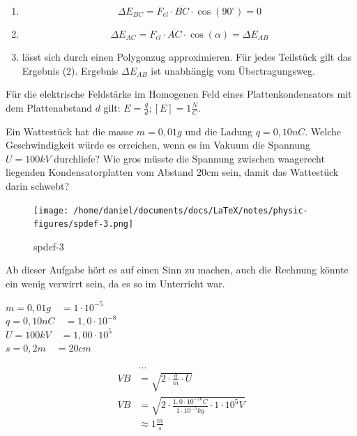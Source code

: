 \documentclass{report}
\begin{document}
\begin{enumerate}
  \item \[\Delta E_{BC}=F_{el} \cdot \overline{BC}\cdot \cos(90^{\circ})=0\]
  \item \[\Delta E_{AC}=F_{el} \cdot \overline{AC}\cdot \cos(\alpha)=\Delta E_{AB}\]
  \item l\"asst sich durch einen Polygonzug approximieren. F\"ur jedes Teilst\"uck gilt das Ergebnis (2). Ergebnis $\Delta E_{AB}$ ist unabh\"angig vom \"Ubertragungsweg.
\end{enumerate}


\begin{tcolorbox}[colback=red!10!white,colframe=red!80!black]
  F\"ur die elektrische Feldst\"arke im Homogenen Feld eines Plattenkondensators mit dem Plattenabstand $d$ gilt: $E=\frac{q}{d}; [E]=1\frac{N}{C}$.
\end{tcolorbox}


\begin{center}
\end{center}

\begin{tcolorbox}[colback=blue!10!white,colframe=blue!80!black]
  Ein Wattest\"uck hat die masse $m=0,01g$ und die Ladung $q=0,10nC$. Welche
  Geschwindigkeit w\"urde es erreichen, wenn es im Vakuum die Spannung
  $U=100kV$ durchliefe? Wie gros m\"usste die Spannung zwischen waagerecht
  liegenden Kondensatorplatten vom Abstand 20cm sein, damit das Wattest\"uck
  darin schwebt?
\end{tcolorbox}

\begin{figure}[htpb]
  \begin{center}
    \texttt{[image: /home/daniel/documents/docs/LaTeX/notes/physic-figures/spdef-3.png]}
  \end{center}
  \caption{spdef-3}
\end{figure}


Ab dieser Aufgabe h\"ort es auf einen Sinn zu machen, auch die Rechnung
k\"onnte ein wenig verwirrt sein, da es so im Unterricht war.

$m=0,01g \quad =1\cdot 10^{-5}$\\
$q=0,10nC\quad =1,0\cdot 10^{-8}$\\
$U=100kV \quad =1,00\cdot 10^{5}$\\
$s=0,2m  \quad =20cm$

\begin{align*}
  &\dots\\
  VB&=\sqrt{2\cdot \frac{q}{m}\cdot U}\\
  VB&=\sqrt{2\cdot \frac{1,0\cdot 10^{-10}C}{1\cdot 10^{-5}kg}\cdot 1 \cdot 10^5V}\\
  &\approx 1 \frac{m}{s}\\
\end{align*}
\end{document}
